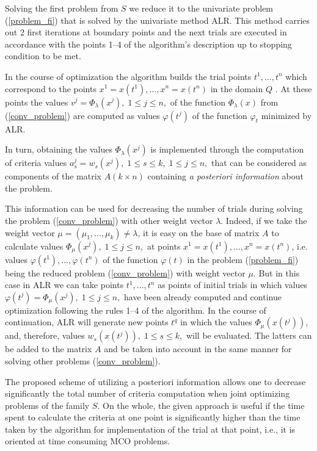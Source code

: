 \documentclass[]{interact}
\theoremstyle{plain}%
\theoremstyle{definition}
\theoremstyle{remark}
\begin{document}
Solving the first problem from $S$ we reduce it to the univariate problem (\ref{problem_fi}) that is solved by the univariate method ALR. This method carries out 2 first iterations at boundary points and the next trials are executed in accordance with the points 1--4 of the algorithm's description up to stopping condition to be met.

In the course of optimization the algorithm builds the trial points $t^1,...,t^n$ which correspond to the points $x^1 = x(t^1),...,x^n=x(t^n)$ in the domain $Q$ . At these points the values $v^j = \Phi_\lambda(x^j), \; 1 \leq j \leq n,$ of the function $\Phi_\lambda(x)$ from (\ref{conv_problem}) are computed as values $\varphi(t^j)$ of the function $\varphi_t$  minimized by ALR.

In turn, obtaining the values $\Phi_\lambda(x^j)$  is implemented through the computation of criteria values $a_s^j = w_s(x^j), \; 1 \leq s \leq k, \; 1 \leq j \leq n,$  that can be considered as components of the matrix $A(k \times n)$ containing \textit{a posteriori information} about the problem.

This information can be used for decreasing the number of trials during solving the problem (\ref{conv_problem}) with other weight vector $\lambda$. Indeed, if we take the weight vector $\mu = (\mu_1,...,\mu_k) \neq \lambda$, it is easy on the base of matrix $A$ to calculate values $\Phi_\mu(x^j), \; 1 \leq j \leq n,$ at points $x^1 = x(t^1),...,x^n=x(t^n)$, i.e. values $\varphi(t^1),...,\varphi(t^n)$ of the function $\varphi(t)$ in the problem (\ref{problem_fi}) being the reduced problem (\ref{conv_problem}) with weight vector $\mu$. But in this case in ALR we can take points $t^1,...,t^n$ as points of initial trials in which values $ \varphi(t^j) = \Phi_\mu(x^j), \; 1 \leq j \leq n,$ have been already computed and continue optimization following the rules 1--4 of the algorithm. In the course of continuation, ALR will generate new points $t^q$ in which the values $\Phi_\mu(x(t^j))$, and, therefore, values $w_s(x(t^j)), \; 1 \leq s \leq k,$ will be evaluated. The latters can be added to the matrix $A$ and be taken into account in the same manner for solving other problems (\ref{conv_problem}). 

The proposed scheme of utilizing a posteriori information allows one to decrease significantly the total number of criteria computation when joint optimizing problems of the family $S$. On the whole, the given approach is useful  if the time spent to calculate the criteria at one point is significantly higher than the time taken by the algorithm for implementation of the trial at that point, i.e., it is oriented at time consuming MCO problems.
 
\end{document}

